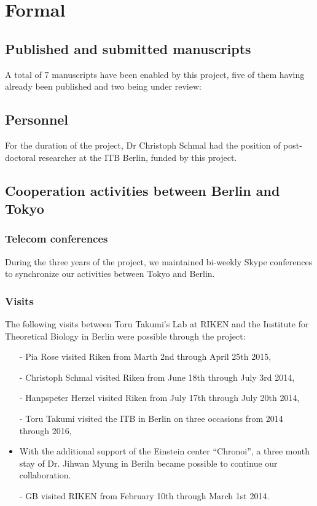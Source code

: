 \documentclass[a4paper]{article}
\begin{document}








\newpage

\section{Formal}

\subsection{Published and submitted manuscripts}
A total of 7 manuscripts have been enabled by this project, five of
them having already been published and two being under review:
\cite{bordyugov2015tuning,schmal2015theoretical,kondoff2015modeling,schmal2017moran,wagner2017plant,myung2017choroid,schmal2017measuring}


\subsection{Personnel}
For the duration of the project, Dr Christoph Schmal had the position
of post-doctoral researcher at the ITB Berlin, funded by this project.

\subsection{Cooperation activities between Berlin and Tokyo}

\subsubsection{Telecom conferences}
During the three years of the project, we maintained bi-weekly Skype
conferences to synchronize our activities between Tokyo and Berlin.

\subsubsection{Visits}
The following visits between Toru Takumi's Lab at RIKEN and the
Institute for Theoretical Biology in Berlin were possible through the
project:
\begin{itemize}
  \item[-] Pia Rose visited Riken from Marth 2nd through April 25th 2015,
  \item[-] Christoph Schmal visited Riken from June 18th through July 3rd
  2014,
  \item[-] Hanpspeter Herzel visited Riken from July 17th through July
  20th 2014,
  \item[-] Toru Takumi visited the ITB in Berlin on three occasions from
  2014 through 2016,
  \item With the additional support of the Einstein center
    ``Chronoi'', a three month stay of Dr. Jihwan Myung in Beriln became
    possible to continue our collaboration.
  \item[-] GB visited RIKEN from February 10th through March 1st 2014.
\end{itemize}
\end{document}
